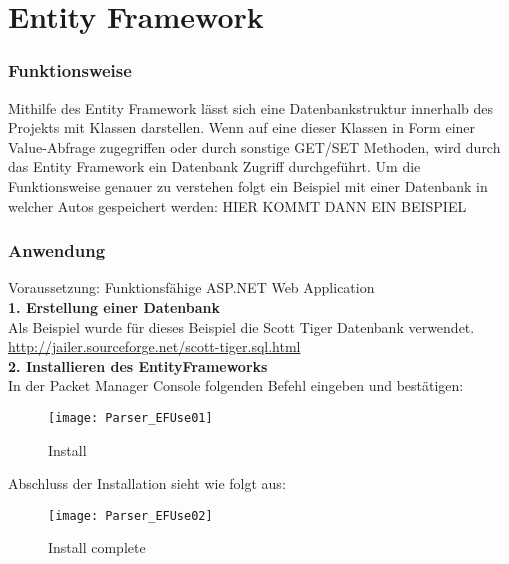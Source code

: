 \section{Entity Framework}
\label{sec:parser-entity-framework}
\subsubsection {Funktionsweise}
Mithilfe des Entity Framework lässt sich eine Datenbankstruktur innerhalb des Projekts mit Klassen darstellen. Wenn auf eine dieser Klassen in Form einer Value-Abfrage zugegriffen oder durch sonstige GET/SET Methoden, wird durch das Entity Framework ein Datenbank Zugriff durchgeführt. 
Um die Funktionsweise genauer zu verstehen folgt ein Beispiel mit einer Datenbank in welcher Autos gespeichert werden:
HIER KOMMT DANN EIN BEISPIEL
\subsubsection {Anwendung}
Voraussetzung: Funktionsfähige ASP.NET Web Application \\
\break \textbf{1. Erstellung einer Datenbank} \\
Als Beispiel wurde für dieses Beispiel die Scott Tiger Datenbank verwendet.
\break \url{http://jailer.sourceforge.net/scott-tiger.sql.html} \\
\break \textbf{2. Installieren des EntityFrameworks} \\
In der Packet Manager Console folgenden Befehl eingeben und bestätigen: 
\begin{figure}[H]
	\centering
    \texttt{[image: Parser\_EFUse01]}
    \caption{Install}
    \label{fig:parsef01}
\end{figure}
Abschluss der Installation sieht wie folgt aus:
\begin{figure}[H]
    \texttt{[image: Parser\_EFUse02]}
    \caption{Install complete}
    \label{fig:parsef02}
\end{figure} 


